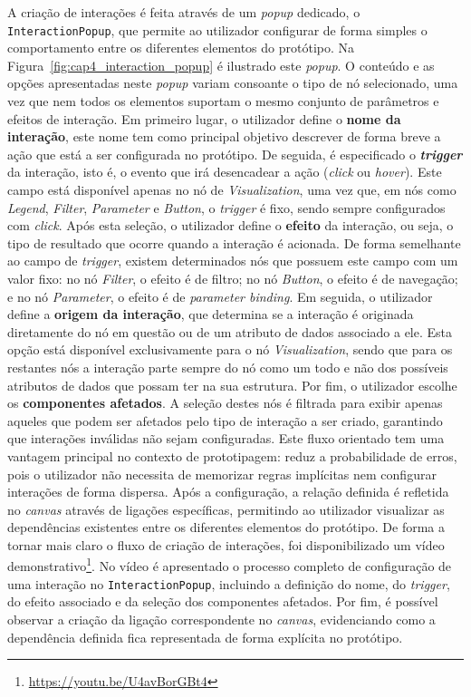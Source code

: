A criação de interações é feita através de um \textit{popup} dedicado, o \texttt{InteractionPopup}, que permite ao utilizador configurar de forma simples o comportamento entre os diferentes elementos do protótipo. Na Figura~\ref{fig:cap4_interaction_popup} é ilustrado este \textit{popup}. O conteúdo e as opções apresentadas neste \textit{popup} variam consoante o tipo de nó selecionado, uma vez que nem todos os elementos suportam o mesmo conjunto de parâmetros e efeitos de interação. Em primeiro lugar, o utilizador define o \textbf{nome da interação}, este nome tem como principal objetivo descrever de forma breve a ação que está a ser configurada no protótipo. De seguida, é especificado o \textbf{\textit{trigger}} da interação, isto é, o evento que irá desencadear a ação (\textit{click} ou \textit{hover}). Este campo está disponível apenas no nó de \textit{Visualization}, uma vez que, em nós como \textit{Legend}, \textit{Filter}, \textit{Parameter} e \textit{Button}, o \textit{trigger} é fixo, sendo sempre configurados com \textit{click}. Após esta seleção, o utilizador define o \textbf{efeito} da interação, ou seja, o tipo de resultado que ocorre quando a interação é acionada. De forma semelhante ao campo de \textit{trigger}, existem determinados nós que possuem este campo com um valor fixo: no nó \textit{Filter}, o efeito é de filtro; no nó \textit{Button}, o efeito é de navegação; e no nó \textit{Parameter}, o efeito é de \textit{parameter binding}. Em seguida, o utilizador define a \textbf{origem da interação}, que determina se a interação é originada diretamente do nó em questão ou de um atributo de dados associado a ele. Esta opção está disponível exclusivamente para o nó \textit{Visualization}, sendo que para os restantes nós a interação parte sempre do nó como um todo e não dos possíveis atributos de dados que possam ter na sua estrutura. Por fim, o utilizador escolhe os \textbf{componentes afetados}. A seleção destes nós é filtrada para exibir apenas aqueles que podem ser afetados pelo tipo de interação a ser criado, garantindo que interações inválidas não sejam configuradas. Este fluxo orientado tem uma vantagem principal no contexto de prototipagem: reduz a probabilidade de erros, pois o utilizador não necessita de memorizar regras implícitas nem configurar interações de forma dispersa. Após a configuração, a relação definida é refletida no \textit{canvas} através de ligações específicas, permitindo ao utilizador visualizar as dependências existentes entre os diferentes elementos do protótipo. De forma a tornar mais claro o fluxo de criação de interações, foi disponibilizado um vídeo demonstrativo\footnote{\url{https://youtu.be/U4avBorGBt4}}. No vídeo é apresentado o processo completo de configuração de uma interação no \texttt{InteractionPopup}, incluindo a definição do nome, do \textit{trigger}, do efeito associado e da seleção dos componentes afetados. Por fim, é possível observar a criação da ligação correspondente no \textit{canvas}, evidenciando como a dependência definida fica representada de forma explícita no protótipo.

